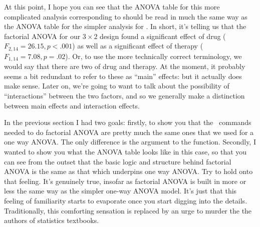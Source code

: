 At this point, I hope you can see that the ANOVA table for this more complicated analysis corresponding to  should be read in much the same way as the ANOVA table for the simpler analysis for . In short, it's telling us that the factorial ANOVA for our $3 \times 2$ design found a significant effect of drug ($F_{2,14} = 26.15, p < .001$) as well as a significant effect of therapy ($F_{1,14} = 7.08, p = .02$). Or, to use the more technically correct terminology, we would say that there are two  of drug and therapy. At the moment, it probably seems a bit redundant to refer to these as ``main'' effects: but it actually does make sense. Later on, we're going to want to talk about the possibility of ``interactions'' between the two factors, and so we generally make a distinction between main effects and interaction effects. 


In the previous section I had two goals: firstly, to show you that the \R\ commands needed to do factorial ANOVA are pretty much the same ones that we used for a one way ANOVA. The only difference is the  argument to the  function. Secondly, I wanted to show you what the ANOVA table looks like in this case, so that you can see from the outset that the basic logic and structure behind factorial ANOVA is the same as that which underpins one way ANOVA. Try to hold onto that feeling. It's genuinely true, insofar as factorial ANOVA is built in more or less the same way as the simpler one-way ANOVA model. It's just that this feeling of familiarity starts to evaporate once you start digging into the details. Traditionally, this comforting sensation is replaced by an urge to murder the the authors of statistics textbooks.

